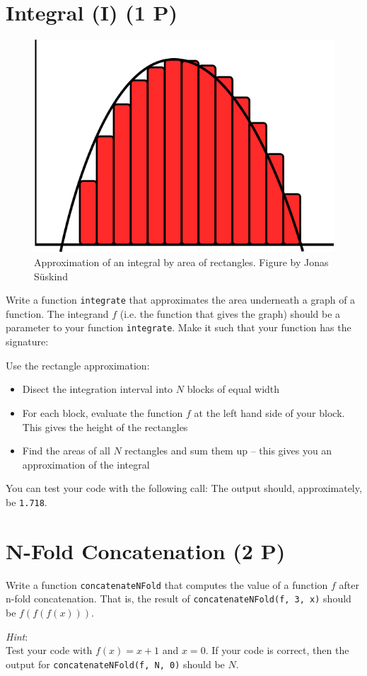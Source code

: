 \documentclass[
	ngerman,
	fontsize=10pt,
	parskip=half,
	titlepage=true,
	DIV=12
]{scrartcl}
\newcommand*{\ie}{i.\;e. }
\begin{document}
\section{Integral (I) (1 P)}
\begin{figure}
	\vspace{-50pt}
	\includegraphics[width=\linewidth]{./integral}
	\caption{Approximation of an integral by area of rectangles.\newline
		Figure by Jonas Süskind}
	\vspace{-50pt}
\end{figure}
Write a function \texttt{integrate} that approximates the area underneath a graph of a function. The integrand $f$ (\ie the function that gives the graph) should be a parameter to your function \texttt{integrate}. Make it such that your function has the signature:

Use the rectangle approximation:
\begin{itemize}
\item Disect the integration interval into $N$ blocks of equal width
\item For each block, evaluate the function $f$ at the left hand side of your block. This gives the height of the rectangles
\item Find the areas of all $N$ rectangles and sum them up -- this gives you an approximation of the integral
\end{itemize}

You can test your code with the following call:
The output should, approximately, be \texttt{1.718}.


\section{N-Fold Concatenation (2 P)}
Write a function \texttt{concatenateNFold} that computes the value of a function $f$ after n-fold concatenation. That is, the result of 
\texttt{concatenateNFold(f, 3, x)}
should be $f(f(f(x)))$.

\emph{Hint}:\\
Test your code with $f(x) = x + 1$ and $x = 0$. If your code is correct, then the output for \texttt{concatenateNFold(f, N, 0)} should be $N$.
\end{document}
